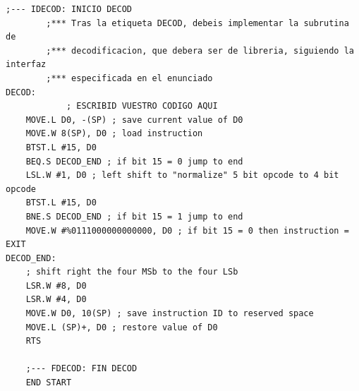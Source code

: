 \documentclass[11pt, a4paper]{article}
\begin{document}
\begin{appendices}
\begin{lstlisting}[style=customasm, caption={HAL9000 emulator code}, label={code:h9kemulator}]
    ;--- IDECOD: INICIO DECOD
        ;*** Tras la etiqueta DECOD, debeis implementar la subrutina de
        ;*** decodificacion, que debera ser de libreria, siguiendo la interfaz
        ;*** especificada en el enunciado
DECOD:
	        ; ESCRIBID VUESTRO CODIGO AQUI
	MOVE.L D0, -(SP) ; save current value of D0
	MOVE.W 8(SP), D0 ; load instruction
	BTST.L #15, D0
	BEQ.S DECOD_END ; if bit 15 = 0 jump to end
	LSL.W #1, D0 ; left shift to "normalize" 5 bit opcode to 4 bit opcode
	BTST.L #15, D0
	BNE.S DECOD_END ; if bit 15 = 1 jump to end
	MOVE.W #%0111000000000000, D0 ; if bit 15 = 0 then instruction = EXIT
DECOD_END:
	; shift right the four MSb to the four LSb
	LSR.W #8, D0
	LSR.W #4, D0
	MOVE.W D0, 10(SP) ; save instruction ID to reserved space
	MOVE.L (SP)+, D0 ; restore value of D0
	RTS

	;--- FDECOD: FIN DECOD
	END	START
	\end{lstlisting}
\end{appendices}
\end{document}
